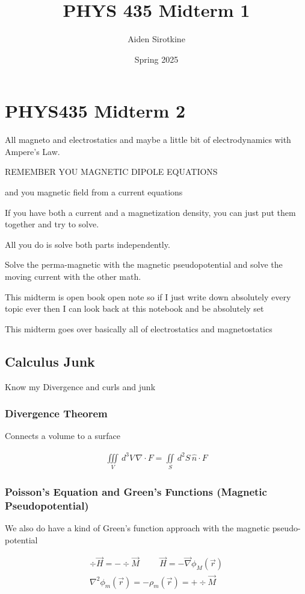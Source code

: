 \documentclass[fleqn]{report}
\date{Spring 2025}
\title{PHYS 435 Midterm 1}
\author{Aiden Sirotkine}
\newcommand{\hp}{\hspace{1cm}}
\newcommand{\equations} [1] {
\begin{gather*}
#1
\end{gather*}
}
\begin{document}
\pagestyle{fancy}
\maketitle
\tableofcontents
\clearpage

\chapter{PHYS435 Midterm 2}
All magneto and electrostatics and maybe a little bit of electrodynamics 
with Ampere's Law. 

REMEMBER YOU MAGNETIC DIPOLE EQUATIONS

and you magnetic field from a current equations 

If you have both a current and a magnetization density, 
you can just put them together and try to solve. 

All you do is solve both parts independently. 

Solve the perma-magnetic with the magnetic pseudopotential and solve 
the moving current with the other math. 

This midterm is open book open note so if I just write down 
absolutely every topic ever then I can look back at this notebook 
and be absolutely set 

This midterm goes over basically all of electrostatics and magnetostatics
\section{Calculus Junk}
Know my Divergence and curls and junk 

\subsection{Divergence Theorem}
Connects a volume to a surface 
\equations{
    \iiint\limits_V \, d^3 V \, 
    \nabla \cdot F 
    =
    \iint\limits_{S} \, d^2 S \, 
    \hat n \cdot F
}

\subsection{Poisson's Equation and Green's Functions (Magnetic Pseudopotential)}
We also do have a kind of Green's function approach 
with the magnetic pseudo-potential 
\equations{
    \div \vec H 
    =
    - 
    \div \vec M 
    \hp 
    \vec H 
    =
    - \vec \nabla \phi_M(\vec r)
    \\
    \nabla^2 \phi_m(\vec r)
    =
    - \rho_m(\vec r)
    =
    + \div \vec M 
}
\end{document}
